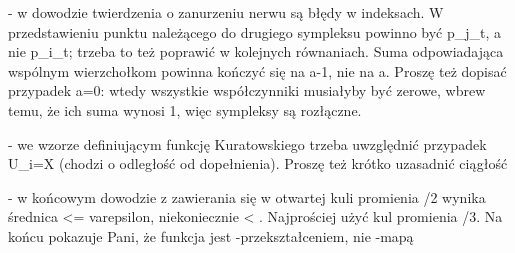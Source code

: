 - w dowodzie twierdzenia o zanurzeniu nerwu są błędy w indeksach. W przedstawieniu punktu należącego do drugiego sympleksu powinno być p_{j_t}, a nie p_{i_t}; trzeba to też poprawić w kolejnych równaniach. Suma odpowiadająca wspólnym wierzchołkom powinna kończyć się na a-1, nie na a. Proszę też dopisać przypadek a=0: wtedy wszystkie współczynniki musiałyby być zerowe, wbrew temu, że ich suma wynosi 1, więc sympleksy są rozłączne.

- we wzorze definiującym funkcję Kuratowskiego trzeba uwzględnić przypadek U_i=X (chodzi o odległość od dopełnienia). Proszę też krótko uzasadnić ciągłość

- w końcowym dowodzie z zawierania się w otwartej kuli promienia \varepsilon/2 wynika średnica <= varepsilon, niekoniecznie < \varepsilon. Najprościej użyć kul promienia \varepsilon/3. Na końcu pokazuje Pani, że funkcja jest \varepsilon-przekształceniem, nie \varepsilon-mapą